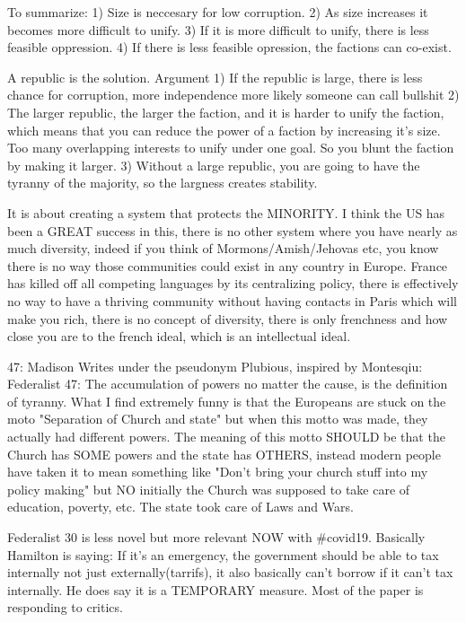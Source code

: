 \documentclass[12pt]{report}
\numberwithin{equation}{section}
\begin{document}
To summarize:
1) Size is neccesary for low corruption.
2) As size increases it becomes more difficult to unify. 
3) If it is more difficult to unify, there is less feasible oppression. 
4) If there is less feasible opression, the factions can co-exist. 



A republic is the solution. Argument 1) If the republic is large, there is less chance for corruption, more independence more likely someone can call bullshit 2) The larger republic, the larger the faction, and it is harder to unify the faction, which means that you can reduce the power of a faction by increasing it's size. Too many overlapping interests to unify under one goal. So you blunt the faction by making it larger. 3) Without a large republic, you are going to have the tyranny of the majority, so the largness creates stability. 

It is about creating a system that protects the MINORITY. I think the US has been a GREAT success in this, there is no other system where you have nearly as much diversity, indeed if you think of Mormons/Amish/Jehovas etc, you know there is no way those communities could exist in any country in Europe. France has killed off all competing languages by its centralizing policy, there is effectively no way to have a thriving community without having contacts in Paris which will make you rich, there is no concept of diversity, there is only frenchness and how close you are to the french ideal, which is an intellectual ideal. 


47:
Madison Writes under the pseudonym Plubious, inspired by Montesqiu: 
Federalist 47: The accumulation of powers no matter the cause, is the definition of tyranny. What I find extremely funny is that the Europeans are stuck on the moto "Separation of Church and state" but when this motto was made, they actually had different powers. The meaning of this motto SHOULD be that the Church has SOME powers and the state has OTHERS, instead modern people have taken it to mean something like "Don't bring your church stuff into my policy making" but NO initially the Church was supposed to take care of education, poverty, etc. The state took care of Laws and Wars. 

Federalist 30 is less novel but more relevant NOW with #covid19. Basically Hamilton is saying: If it's an emergency, the government should be able to tax internally not just externally(tarrifs), it also basically can't borrow if it can't tax internally. He does say it is a TEMPORARY measure. Most of the paper is responding to critics. 
\end{document}
